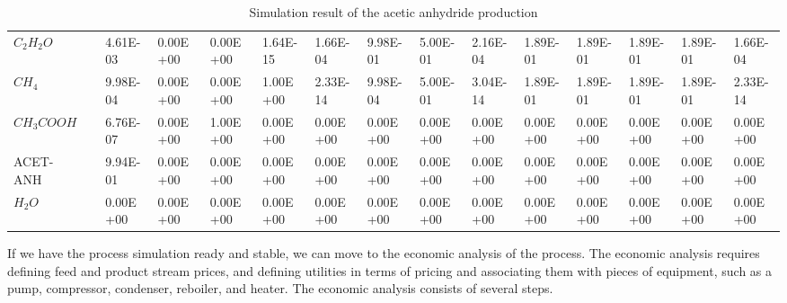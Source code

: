 \begin{table}[h!]
{\begin{tabular}{ll|lllllllllllll}
			$C_2H_2O$          &         & 4.61E-03 & 0.00E+00 & 0.00E+00 & 1.64E-15  & 1.66E-04 & 9.98E-01 & 5.00E-01  & 2.16E-04 & 1.89E-01 & 1.89E-01 & 1.89E-01 & 1.89E-01 & 1.66E-04 \\
			$CH_4$            &         & 9.98E-04 & 0.00E+00 & 0.00E+00 & 1.00E+00  & 2.33E-14 & 9.98E-04 & 5.00E-01  & 3.04E-14 & 1.89E-01 & 1.89E-01 & 1.89E-01 & 1.89E-01 & 2.33E-14 \\
			$CH_3COOH$        &         & 6.76E-07 & 0.00E+00 & 1.00E+00 & 0.00E+00  & 0.00E+00 & 0.00E+00 & 0.00E+00  & 0.00E+00 & 0.00E+00 & 0.00E+00 & 0.00E+00 & 0.00E+00 & 0.00E+00 \\
			ACET-ANH       &         & 9.94E-01 & 0.00E+00 & 0.00E+00 & 0.00E+00  & 0.00E+00 & 0.00E+00 & 0.00E+00  & 0.00E+00 & 0.00E+00 & 0.00E+00 & 0.00E+00 & 0.00E+00 & 0.00E+00 \\
			$H_2O$          &         & 0.00E+00 & 0.00E+00 & 0.00E+00 & 0.00E+00  & 0.00E+00 & 0.00E+00 & 0.00E+00  & 0.00E+00 & 0.00E+00 & 0.00E+00 & 0.00E+00 & 0.00E+00 & 0.00E+00
		\end{tabular} }
	\caption{Simulation result of the acetic anhydride production}
	\label{tab:Acet_Simu_Result_Basic}
	\end{table}

	If we have the process simulation ready and stable, we can move to the economic analysis of the process. The economic analysis requires defining feed and product stream prices, and defining utilities in terms of pricing and associating them with pieces of equipment, such as a pump, compressor, condenser, reboiler, and heater. The economic analysis consists of several steps.
	
